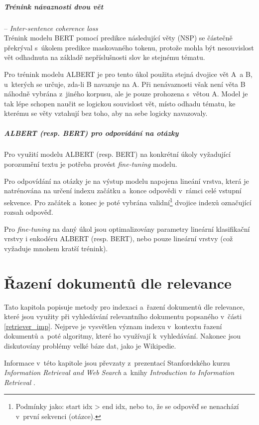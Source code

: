 \paragraph{Trénink návaznosti dvou vět} -- \textit{Inter-sentence coherence loss}\\
Trénink modelu BERT pomocí predikce následující věty (NSP) se částečně překrýval s~úkolem predikce maskovaného tokenu, protože mohla být nesouvislost vět odhadnuta na základě nepříslušnosti slov ke stejnému tématu.\par
Pro trénink modelu ALBERT je pro tento úkol použita stejná dvojice vět A~a B, u~kterých se určuje, zda-li B navazuje na A. Při nenávaznosti však není věta B náhodně vybrána z~jiného korpusu, ale je pouze prohozena s~větou A. Model je tak lépe schopen naučit se logickou souvislost vět, místo odhadu tématu, ke kterému se věty vztahují bez toho, aby na sebe logicky navazovaly.
\bigskip\bigskip
\paragraph{ALBERT (resp. BERT) pro odpovídání na otázky}
Pro využití modelu ALBERT (resp. BERT) na konkrétní úkoly vyžadující porozumění textu je potřeba provést \emph{fine-tuning} modelu.\par
Pro odpovídání na otázky je na výstup modelu napojena lineání vrstva, která je natrénována na určení indexu začátku a~konce odpovědi v~rámci celé vstupní sekvence. Pro začátek a~konec je poté vybrána validní\footnote{Podmínky jako: start idx > end idx, nebo to, že se odpověď se nenachází v~první sekvenci (otázce).} dvojice indexů označující rozsah odpověď.\par
Pro \emph{fine-tuning} na daný úkol jsou optimalizovány parametry lineární klasifikační vrstvy i enkodéru ALBERT (resp. BERT), nebo pouze lineární vrstvy (což vyžaduje mnohem kratší trénink).


\chapter{Řazení dokumentů dle relevance}
\label{document_indexing}
Tato kapitola popisuje metody pro indexaci a~řazení dokumentů dle relevance, které jsou využity při vyhledávání relevantního dokumentu popsaného v~části \ref{retriever_imp}. Nejprve je vysvětlen význam indexu v~kontextu řazení dokumentů a~poté algoritmy, které ho využívají k~vyhledávání. Nakonec jsou diskutovány problémy velké báze dat, jako je Wikipedie.\par
Informace v~této kapitole jsou převzaty z~prezentací Stanfordského kurzu \emph{Information Retrieval and Web Search} \cite{stanford:retrieval} a~knihy \emph{Introduction to Information Retrieval} \cite{information_retrieval}.

